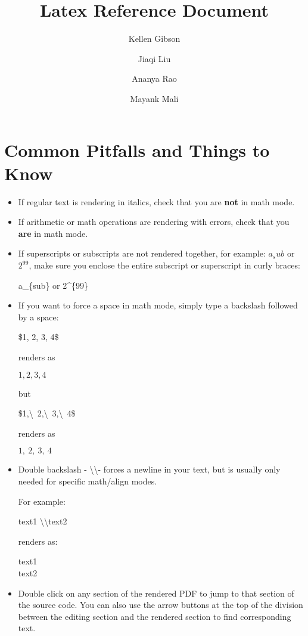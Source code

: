 \documentclass[11pt,onecolumn]{article}
\date{}
\author{Kellen Gibson\\
\and
Jiaqi Liu\\
\and
Ananya Rao\\
\and
Mayank Mali}
\title{{\Huge Latex Reference Document}\vspace{-2ex}}
\theoremstyle{definition}
\begin{document}
\maketitle
\tableofcontents

\pagebreak
\section{Common Pitfalls and Things to Know}
\begin{itemize}
    \item If regular text is rendering in italics, check that you are \textbf{not} in math mode.
    \item If arithmetic or math operations are rendering with errors, check that you \textbf{are} in math mode.
    \item If superscripts or subscripts are not rendered together, for example: $a_sub$ or $2^99$, make sure you enclose the entire subscript or superscript in curly braces:
    \begin{tcolorbox}
    a\_\{sub\} or 2\^{}\{99\}
    \end{tcolorbox}
    
    \item If you want to force a space in math mode, simply type a backslash followed by a space:
    
    \begin{tcolorbox}
    \$1, 2, 3, 4\$
    \end{tcolorbox}
    
    renders as
    
    $1, 2, 3, 4$
    
    but
    
    \begin{tcolorbox}
    \$1,\textbackslash\ 2,\textbackslash\ 3,\textbackslash\ 4\$
    \end{tcolorbox}
    
    renders as 
    
    $1,\ 2,\ 3,\ 4$
    
    \item Double backslash - \textbackslash\textbackslash - forces a newline in your text, but is usually only needed for specific math/align modes. 
    
    For example:
    
    \begin{tcolorbox}
    text1 \textbackslash \textbackslash text2
    \end{tcolorbox}
    
    renders as:
    
    text1 \\ text2
    
    \item Double click on any section of the rendered PDF to jump to that section of the source code. You can also use the arrow buttons at the top of the division between the editing section and the rendered section to find corresponding text.
\end{itemize}
\end{document}
